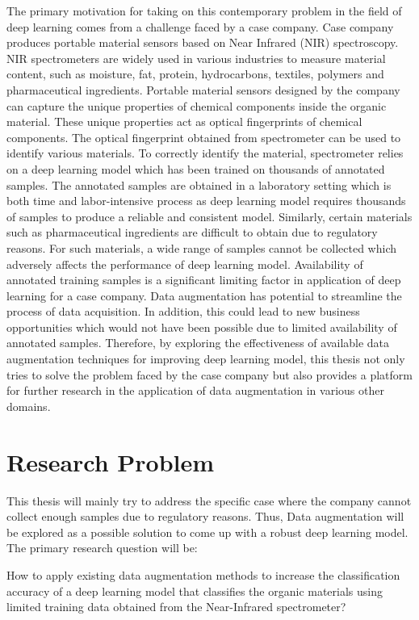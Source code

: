 The primary motivation for taking on this contemporary problem in the field of deep learning comes from a challenge faced by a case company. Case company produces portable material sensors based on Near Infrared (NIR) spectroscopy. NIR spectrometers are widely used in various industries to measure material content, such as moisture, fat, protein, hydrocarbons, textiles, polymers and pharmaceutical ingredients. Portable material sensors designed by the company can capture the unique properties of chemical components inside the organic material. These unique properties act as optical fingerprints of chemical components. The optical fingerprint obtained from spectrometer can be used to identify various materials. To correctly identify the material, spectrometer relies on a deep learning model which has been trained on thousands of annotated samples. The annotated samples are obtained in a laboratory setting which is both time and labor-intensive process as deep learning model requires thousands of samples to produce a reliable and consistent model. Similarly, certain materials such as pharmaceutical ingredients are difficult to obtain due to regulatory reasons. For such materials, a wide range of samples cannot be collected which adversely affects the performance of deep learning model. Availability of annotated training samples is a significant limiting factor in application of deep learning for a case company. Data augmentation has potential to streamline the process of data acquisition. In addition, this could lead to new business opportunities which would not have been possible due to limited availability of annotated samples.  
Therefore, by exploring the effectiveness of available data augmentation techniques for improving deep learning model, this thesis not only tries to solve the problem faced by the case company but also provides a platform for further research in the application of data augmentation in various other domains.

\section{Research Problem}

This thesis will mainly try to address the specific case where the company cannot collect enough samples due to regulatory reasons. Thus, Data augmentation will be explored as a possible solution to come up with a robust deep learning model. The primary research question will be:

How to apply existing data augmentation methods to increase the classification accuracy of a deep learning model that classifies the organic materials using limited training data obtained from the Near-Infrared spectrometer?

